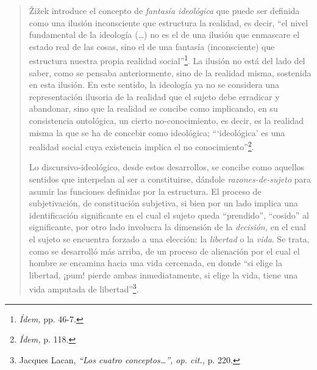 \begin{quote}
Žižek introduce el concepto de \emph{fantasía ideológica} que puede ser definida como una ilusión inconsciente que estructura la realidad, es decir, \enquote{el nivel fundamental de la ideología (\dots) no es el de una ilusión que enmascare el estado real de las cosas, sino el de una fantasía (inconsciente) que estructura nuestra propia realidad social}\footnote{\emph{Ídem,} pp. 46-7.}. La ilusión no está del lado del saber, como se pensaba anteriormente, sino de la realidad misma, sostenida en esta ilusión. En este sentido, la ideología ya no se considera una representación ilusoria de la realidad que el sujeto debe erradicar y abandonar, sino que la realidad se concibe como implicando, en su consistencia ontológica, un cierto no-conocimiento, es decir, es la realidad misma la que se ha de concebir como ideológica; \enquote{\enquote{ideológica} es una realidad social cuya existencia implica el no conocimiento}\footnote{\emph{Ídem,} p. 118.}.

Lo discursivo-ideológico, desde estos desarrollos, se concibe como aquellos sentidos que interpelan al ser a constituirse, dándole \emph{razones-de-sujeto} para asumir las funciones definidas por la estructura. El proceso de subjetivación, de constitución subjetiva, si bien por un lado implica una identificación significante en el cual el sujeto queda \enquote{prendido}, \enquote{cosido} al significante, por otro lado involucra la dimensión de la \emph{decisión,} en el cual el sujeto se encuentra forzado a una elección: la \emph{libertad} o la \emph{vida}. Se trata, como se desarrolló más arriba, de un proceso de alienación por el cual el hombre se encamina hacia una vida cercenada, en donde \enquote{si elige la libertad, ¡pum! pierde ambas inmediatamente, si elige la vida, tiene una vida amputada de libertad}\footnote{Jacques Lacan, \emph{\enquote{Los cuatro conceptos\ldots}, op. cit.,} p. 220.}.


\end{quote}
